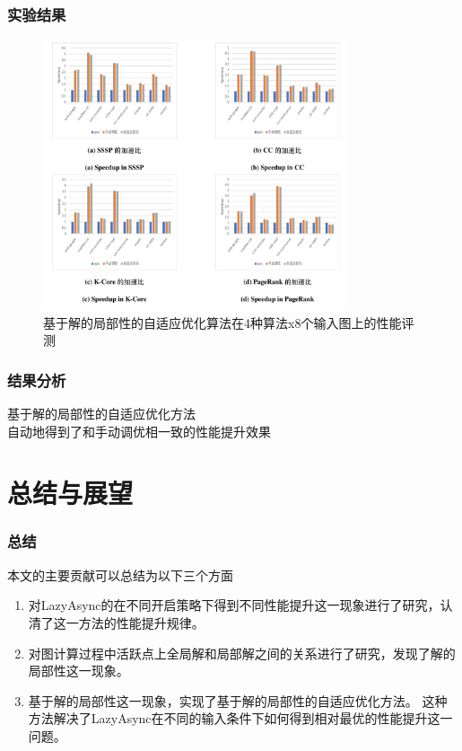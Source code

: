 \documentclass[10pt]{beamer}
\begin{document}
\begin{frame}%
  \frametitle{实验结果}
  \vspace{-0.5em}
  \begin{figure}[H]
    \centering
    \includegraphics[width=0.8\textwidth]{Img/ppt_speedup.png}
    \caption[]{基于解的局部性的自适应优化算法在4种算法x8个输入图上的性能评测}
  \end{figure}
\end{frame}



\begin{frame}%
  \frametitle{结果分析}
  \begin{center}
    基于解的局部性的自适应优化方法\\
    自动地得到了和手动调优相一致的性能提升效果
  \end{center}
\end{frame}

\section{总结与展望}

\begin{frame}%
  \frametitle{总结}
  \begin{block}
    {本文的主要贡献可以总结为以下三个方面}
    \begin{enumerate}
      \item  对LazyAsync的在不同开启策略下得到不同性能提升这一现象进行了研究，认清了这一方法的性能提升规律。
      \item 对图计算过程中活跃点上全局解和局部解之间的关系进行了研究，发现了解的局部性这一现象。
      \item 基于解的局部性这一现象，实现了基于解的局部性的自适应优化方法。
      这种方法解决了LazyAsync在不同的输入条件下如何得到相对最优的性能提升这一问题。
    \end{enumerate}
  \end{block}
\end{frame}
\end{document}
